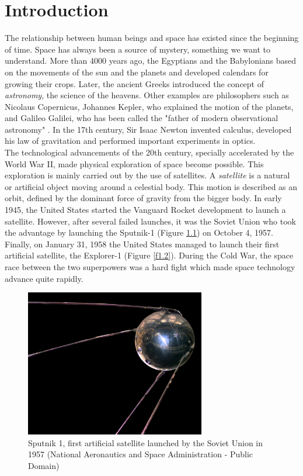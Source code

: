 \cleardoublepage
\setcounter{page}{1}

\chapter{Introduction} 
The relationship between human beings and space has existed since the beginning of time. Space has always been a source of mystery, something we want to understand. More than 4000 years ago, the Egyptians and the Babylonians based on the movements of the sun and the planets and developed calendars for growing their crops. Later, the ancient Greeks introduced the concept of \emph{astronomy}, the science of the heavens. Other examples are philosophers such as Nicolaus Copernicus, Johannes Kepler, who explained the motion of the planets, and Galileo Galilei, who has been called the "father of modern observational astronomy" \cite{Singer}. In the 17th century, Sir Isaac Newton invented calculus, developed his law of gravitation and performed important experiments in optics.\\

The technological advancements of the 20th century, specially accelerated by the World War II, made physical exploration of space become possible. This exploration is mainly carried out by the use of satellites. A \emph{satellite} is a natural or artificial object moving around a celestial body. This motion is described as an orbit, defined by the dominant force of gravity from the bigger body. In early 1945, the United States started the Vanguard Rocket development to launch a satellite. However, after several failed launches, it was the Soviet Union who took the advantage by launching the Sputnik-1 (Figure \ref{f1.1}) on October 4, 1957. Finally, on January 31, 1958 the United States managed to launch their first artificial satellite, the Explorer-1 (Figure \ref{f1.2}). During the Cold War, the space race between the two superpowers was a hard fight which made space technology advance quite rapidly.

\begin{figure}[H]
\centerline{\includegraphics[width=0.7\textwidth]{images/sputnik.jpg}}
\caption{Sputnik 1, first artificial satellite launched by the Soviet Union in 1957  (National Aeronautics and Space Administration - Public Domain)}
\label{f1.1}
\end{figure}


